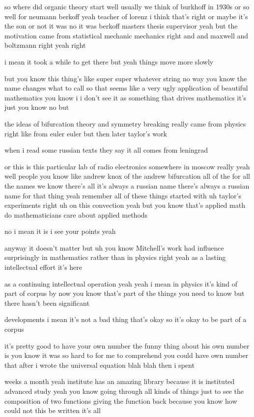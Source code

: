 \begin{description}
so where did organic theory start well usually we think of burkhoff in 1930s or so well for neumann berkoff yeah teacher of lorenz i think that's right or maybe it's the son or not it was no it was berkoff masters thesis supervisor yeah but the motivation came from statistical mechanic mechanics right and and maxwell and boltzmann right yeah right

i mean it took a while to get there but yeah things move more slowly

but you know this thing's like super super whatever string no way you know the name changes what to call so that seems like a very ugly application of beautiful mathematics you know i i don't see it as something that drives mathematics it's just you know no but

the ideas of bifurcation theory and symmetry breaking really came from physics right like from euler euler but then later taylor's work

when i read some russian texts they say it all comes from leningrad

or this is this particular lab of radio electronics somewhere in moscow really yeah well people you know like andrew knox of the andrew bifurcation all of the for all the names we know there's all it's always a russian name there's always a russian name for that thing yeah remember all of these things started with uh taylor's experiments right uh on this convection yeah but you know that's applied math do mathematicians care about applied methods

no i mean it is i see your points yeah

anyway it doesn't matter but uh you know Mitchell's work had influence surprisingly in mathematics rather than in physics right yeah as a lasting intellectual effort it's here

as a continuing intellectual operation yeah yeah i mean in physics it's kind of part of corpus by now you know that's part of the things you need to know but there hasn't been significant

developments i mean it's not a bad thing that's okay so it's okay to be part of a corpus

it's pretty good to have your own number the funny thing about his own number is you know it was so hard to for me to comprehend you could have own number that after i wrote the universal equation blah blah then i spent

weeks a month yeah institute has an amazing library because it is instituted advanced study yeah you know going through all kinds of things just to see the composition of two functions giving the function back because you know how could not this be written it's all


\end{description}
